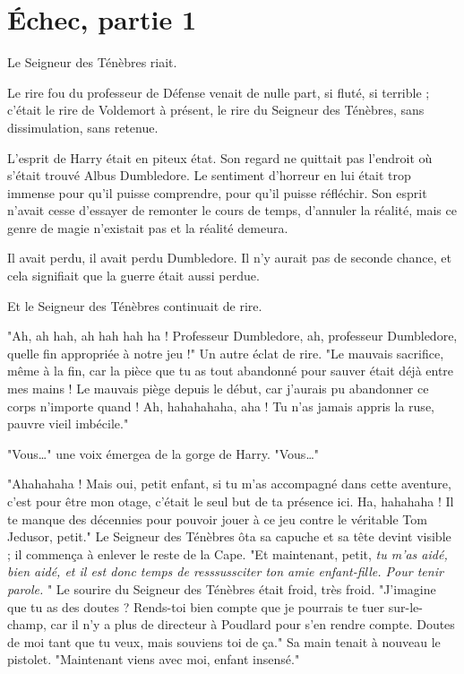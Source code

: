 
\chapter{Échec, partie 1}

Le Seigneur des Ténèbres riait.

Le rire fou du professeur de Défense venait de nulle part, si fluté, si terrible ; c'était le rire de Voldemort à présent, le rire du Seigneur des Ténèbres, sans dissimulation, sans retenue.

L'esprit de Harry était en piteux état. Son regard ne quittait pas l'endroit où s'était trouvé Albus Dumbledore. Le sentiment d'horreur en lui était trop immense pour qu'il puisse comprendre, pour qu'il puisse réfléchir. Son esprit n'avait cesse d'essayer de remonter le cours de temps, d'annuler la réalité, mais ce genre de magie n'existait pas et la réalité demeura.

Il avait perdu, il avait perdu Dumbledore. Il n'y aurait pas de seconde chance, et cela signifiait que la guerre était aussi perdue.

Et le Seigneur des Ténèbres continuait de rire.

"Ah, ah hah, ah hah hah ha ! Professeur Dumbledore, ah, professeur Dumbledore, quelle fin appropriée à notre jeu !" Un autre éclat de rire. "Le mauvais sacrifice, même à la fin, car la pièce que tu as tout abandonné pour sauver était déjà entre mes mains ! Le mauvais piège depuis le début, car j'aurais pu abandonner ce corps n'importe quand ! Ah, hahahahaha, aha ! Tu n'as jamais appris la ruse, pauvre vieil imbécile."

"Vous…" une voix émergea de la gorge de Harry. "Vous…"

"Ahahahaha ! Mais oui, petit enfant, si tu m'as accompagné dans cette aventure, c'est pour être mon otage, c'était le seul but de ta présence ici. Ha, hahahaha ! Il te manque des décennies pour pouvoir jouer à ce jeu contre le véritable Tom Jedusor, petit." Le Seigneur des Ténèbres ôta sa capuche et sa tête devint visible ; il commença à enlever le reste de la Cape. "Et maintenant, petit, \emph{tu m'as aidé, bien aidé, et il est donc temps de resssussciter ton amie enfant-fille. Pour tenir parole.} " Le sourire du Seigneur des Ténèbres était froid, très froid. "J'imagine que tu as des doutes ? Rends-toi bien compte que je pourrais te tuer sur-le-champ, car il n'y a plus de directeur à Poudlard pour s'en rendre compte. Doutes de moi tant que tu veux, mais souviens toi de ça." Sa main tenait à nouveau le pistolet. "Maintenant viens avec moi, enfant insensé."

